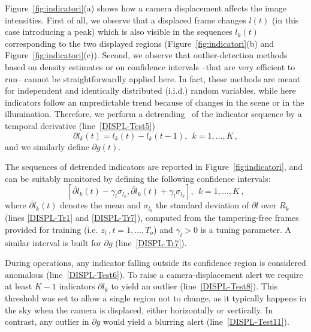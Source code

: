 \documentclass{llncs}
\begin{document}
Figure~\ref{fig:indicatori}(a) shows how a camera displacement affects the image intensities. First of all, we observe that a displaced frame changes $l(t)$ (in this case introducing a peak) which is also visible in the sequences $l_k(t)$ corresponding to the two displayed regions (Figure~\ref{fig:indicatori}(b) and Figure~\ref{fig:indicatori}(c)). Second, we observe that outlier-detection methods~\cite{Chandola2009} based on density estimates or on confidence intervals --that are very efficient to run-- cannot be straightforwardly applied here. In fact, these methods are meant for independent and identically distributed (i.i.d.) random variables, while here indicators follow an unpredictable trend because of changes in the scene or in the illumination. Therefore, we perform a detrending~\cite{Gustafsson2000} of the indicator sequence by a temporal derivative (line~\ref{DISPL-Test5})
\begin{equation}\label{eq:detrending}
 \partial l_k(t) = l_k(t)-l_k(t-1),  \ \ k = 1, \dots, K\,,
\end{equation}
and we similarly define $\partial g(t)$. 

The sequences of detrended indicators are reported in Figure~\ref{fig:indicatori}, and can be suitably monitored by defining the following confidence intervals:
\begin{equation}\label{eq:confidenceRegions}
 [\overline{\partial l}_k(t) - \gamma_l \sigma_{l_k}, \overline{\partial l}_k(t) + \gamma_l \sigma_{l_k}], \ \  k = 1,\dots,K\,,
\end{equation}
where $\overline{\partial l}_k(t)$ denotes the mean and $\sigma_{l_k}$ the standard deviation of $\partial l$ over $R_k$ (lines \ref{DISPL-Tr1} and \ref{DISPL-Tr7}), computed from the tampering-free frames provided for training (i.e. $z_t\,, t = 1, \dots, T_o$) and $\gamma_l >0$ is a tuning parameter. A similar interval is built for $\partial g$ (line~\ref{DISPL-Tr7}). 

During operations, any indicator falling outside its confidence region is considered anomalous (line~\ref{DISPL-Test6}). To raise a camera-displacement alert we require at least $K-1$ indicators $\partial l_k$ to yield an outlier (line~\ref{DISPL-Test8}). This threshold was set to allow a single region not to change, as it typically happens in the sky when the camera is displaced, either horizontally or vertically. In contrast, any outlier in $\partial g$ would yield a blurring alert (line~\ref{DISPL-Test11}).
\end{document}

